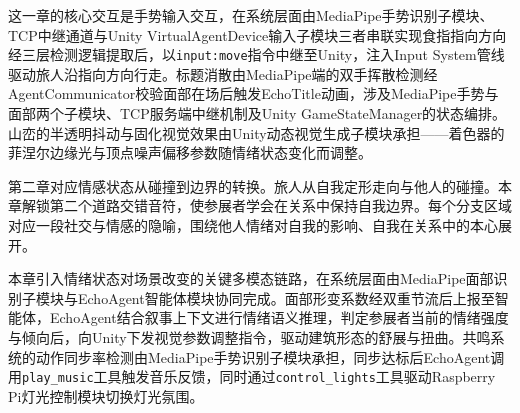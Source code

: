 \documentclass[bachelor]{njupthesis}
\begin{document}
这一章的核心交互是手势输入交互，在系统层面由MediaPipe手势识别子模块、TCP中继通道与Unity VirtualAgentDevice输入子模块三者串联实现食指指向方向经三层检测逻辑提取后，以\texttt{input:move}指令中继至Unity，注入Input System管线驱动旅人沿指向方向行走。标题消散由MediaPipe端的双手挥散检测经AgentCommunicator校验面部在场后触发EchoTitle动画，涉及MediaPipe手势与面部两个子模块、TCP服务端中继机制及Unity GameStateManager的状态编排。山峦的半透明抖动与固化视觉效果由Unity动态视觉生成子模块承担——着色器的菲涅尔边缘光与顶点噪声偏移参数随情绪状态变化而调整。


\medskip
\setlength{\fboxsep}{5pt}
\setlength{\fboxrule}{0.8pt}
\noindent{}

第二章对应情感状态从碰撞到边界的转换。旅人从自我定形走向与他人的碰撞。本章解锁第二个道路交错音符，使参展者学会在关系中保持自我边界。每个分支区域对应一段社交与情感的隐喻，围绕他人情绪对自我的影响、自我在关系中的本心展开。

本章引入情绪状态对场景改变的关键多模态链路，在系统层面由MediaPipe面部识别子模块与EchoAgent智能体模块协同完成。面部形变系数经双重节流后上报至智能体，EchoAgent结合叙事上下文进行情绪语义推理，判定参展者当前的情绪强度与倾向后，向Unity下发视觉参数调整指令，驱动建筑形态的舒展与扭曲。共鸣系统的动作同步率检测由MediaPipe手势识别子模块承担，同步达标后EchoAgent调用\texttt{play\_music}工具触发音乐反馈，同时通过\texttt{control\_lights}工具驱动Raspberry Pi灯光控制模块切换灯光氛围。
\end{document}
